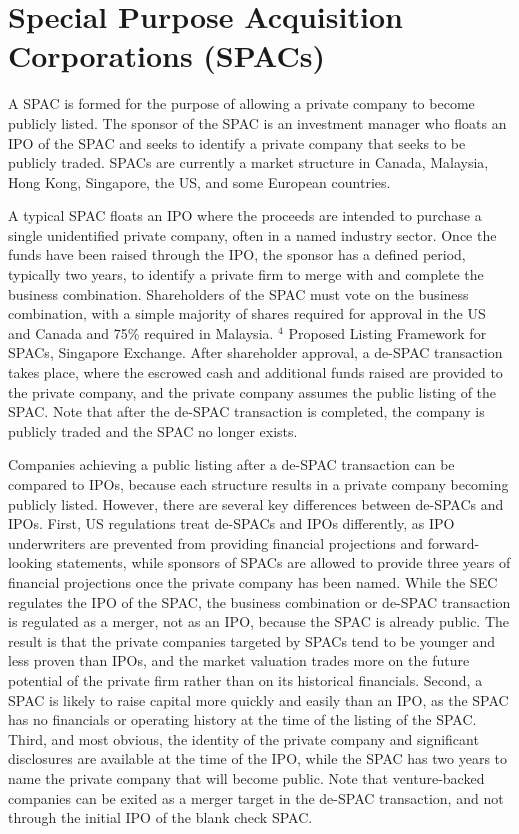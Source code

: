 \documentclass[11pt]{article}
\begin{document}
\section*{Special Purpose Acquisition Corporations (SPACs)}
A SPAC is formed for the purpose of allowing a private company to become publicly listed. The sponsor of the SPAC is an investment manager who floats an IPO of the SPAC and seeks to identify a private company that seeks to be publicly traded. SPACs are currently a market structure in Canada, Malaysia, Hong Kong, Singapore, the US, and some European countries.

A typical SPAC floats an IPO where the proceeds are intended to purchase a single unidentified private company, often in a named industry sector. Once the funds have been raised through the IPO, the sponsor has a defined period, typically two years, to identify a private firm to merge with and complete the business combination. Shareholders of the SPAC must vote on the business combination, with a simple majority of shares required for approval in the US and Canada and 75\% required in Malaysia. ${ }^{4}$ Proposed Listing Framework for SPACs, Singapore Exchange. After shareholder approval, a de-SPAC transaction takes place, where the escrowed cash and additional funds raised are provided to the private company, and the private company assumes the public listing of the SPAC. Note that after the de-SPAC transaction is completed, the company is publicly traded and the SPAC no longer exists.

Companies achieving a public listing after a de-SPAC transaction can be compared to IPOs, because each structure results in a private company becoming publicly listed. However, there are several key differences between de-SPACs and IPOs. First, US regulations treat de-SPACs and IPOs differently, as IPO underwriters are prevented from providing financial projections and forward-looking statements, while sponsors of SPACs are allowed to provide three years of financial projections once the private company has been named. While the SEC regulates the IPO of the SPAC, the business combination or de-SPAC transaction is regulated as a merger, not as an IPO, because the SPAC is already public. The result is that the private companies targeted by SPACs tend to be younger and less proven than IPOs, and the market valuation trades more on the future potential of the private firm rather than on its historical financials. Second, a SPAC is likely to raise capital more quickly and easily than an IPO, as the SPAC has no financials or operating history at the time of the listing of the SPAC. Third, and most obvious, the identity of the private company and significant disclosures are available at the time of the IPO, while the SPAC has two years to name the private company that will become public. Note that venture-backed companies can be exited as a merger target in the de-SPAC transaction, and not through the initial IPO of the blank check SPAC.
\end{document}
